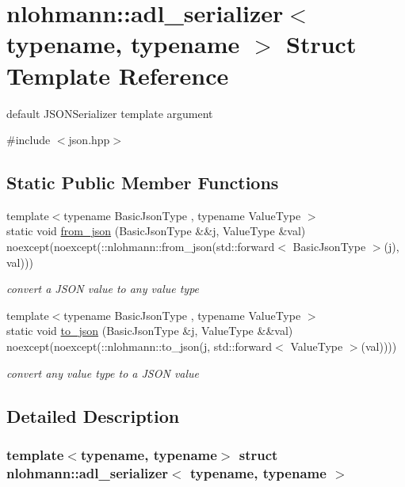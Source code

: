 \hypertarget{structnlohmann_1_1adl__serializer}{}\section{nlohmann\+:\+:adl\+\_\+serializer$<$ typename, typename $>$ Struct Template Reference}
\label{structnlohmann_1_1adl__serializer}


default J\+S\+O\+N\+Serializer template argument  




{\ttfamily \#include $<$json.\+hpp$>$}

\subsection*{Static Public Member Functions}
\begin{DoxyCompactItemize}
\item 
{\footnotesize template$<$typename Basic\+Json\+Type , typename Value\+Type $>$ }\\static void \mbox{\hyperlink{structnlohmann_1_1adl__serializer_ab39cad07c1a2bf4414d6cae5215b4e7a}{from\+\_\+json}} (Basic\+Json\+Type \&\&j, Value\+Type \&val) noexcept(noexcept(\+::nlohmann\+::from\+\_\+json(std\+::forward$<$ Basic\+Json\+Type $>$(j), val)))
\begin{DoxyCompactList}\small\item\em convert a J\+S\+ON value to any value type \end{DoxyCompactList}\item 
{\footnotesize template$<$typename Basic\+Json\+Type , typename Value\+Type $>$ }\\static void \mbox{\hyperlink{structnlohmann_1_1adl__serializer_adf8cd96afe6ab243b67392dfe35ace89}{to\+\_\+json}} (Basic\+Json\+Type \&j, Value\+Type \&\&val) noexcept(noexcept(\+::nlohmann\+::to\+\_\+json(j, std\+::forward$<$ Value\+Type $>$(val))))
\begin{DoxyCompactList}\small\item\em convert any value type to a J\+S\+ON value \end{DoxyCompactList}\end{DoxyCompactItemize}


\subsection{Detailed Description}
\subsubsection*{template$<$typename, typename$>$\newline
struct nlohmann\+::adl\+\_\+serializer$<$ typename, typename $>$}

